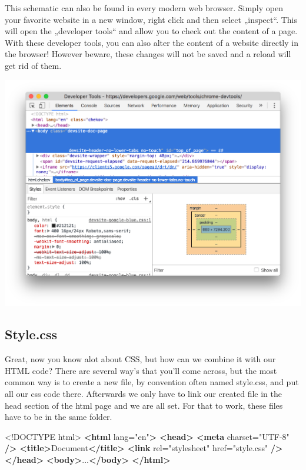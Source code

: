 \documentclass[
]{book}
\newenvironment{Shaded}{\begin{snugshade}}{\end{snugshade}}
\newcommand{\DataTypeTok}[1]{\textcolor[rgb]{0.13,0.29,0.53}{#1}}
\newcommand{\KeywordTok}[1]{\textcolor[rgb]{0.13,0.29,0.53}{\textbf{#1}}}
\newcommand{\NormalTok}[1]{#1}
\newcommand{\OtherTok}[1]{\textcolor[rgb]{0.56,0.35,0.01}{#1}}
\newcommand{\StringTok}[1]{\textcolor[rgb]{0.31,0.60,0.02}{#1}}
\begin{document}
This schematic can also be found in every modern web browser. Simply open your favorite website in a new window, right click and then select „inspect``. This will open the „developer tools`` and allow you to check out the content of a page. With these developer tools, you can also alter the content of a website directly in the browser! However beware, these changes will not be saved and a reload will get rid of them.

\includegraphics{docs/assets/ta-website.png}

\hypertarget{style.css}{%
\subsection*{Style.css}\label{style.css}}

Great, now you know alot about CSS, but how can we combine it with our HTML code? There are several way's that you'll come across, but the most common way is to create a new file, by convention often named style.css, and put all our css code there. Afterwards we only have to link our created file in the head section of the html page and we are all set. For that to work, these files have to be in the same folder.

\begin{Shaded}
\begin{Highlighting}[]
\DataTypeTok{\textless{}!DOCTYPE }\NormalTok{html}\DataTypeTok{\textgreater{}}
\KeywordTok{\textless{}html}\OtherTok{ lang=}\StringTok{"en"}\KeywordTok{\textgreater{}}
  \KeywordTok{\textless{}head\textgreater{}}
    \KeywordTok{\textless{}meta}\OtherTok{ charset=}\StringTok{"UTF{-}8"} \KeywordTok{/\textgreater{}}
    \KeywordTok{\textless{}title\textgreater{}}\NormalTok{Document}\KeywordTok{\textless{}/title\textgreater{}}
    \KeywordTok{\textless{}link}\OtherTok{ rel=}\StringTok{"stylesheet"}\OtherTok{ href=}\StringTok{"style.css"} \KeywordTok{/\textgreater{}}
  \KeywordTok{\textless{}/head\textgreater{}}
  \KeywordTok{\textless{}body\textgreater{}}\NormalTok{...}\KeywordTok{\textless{}/body\textgreater{}}
\KeywordTok{\textless{}/html\textgreater{}}
\end{Highlighting}
\end{Shaded}
\end{document}
